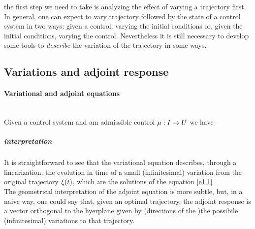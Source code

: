 the first step we need to take is analyzing the effect of varying a trajectory first. In general, one can expect to vary trajectory followed by the state of a control system in two ways: given a control, varying the initial conditions or, given the initial conditions, varying the control. Nevertheless it is still necessary to develop some tools to \textit{describe} the variation of the trajectory in some ways. 

\subsection{Variations and adjoint response}
\paragraph{Variational and adjoint equations}\mbox{}\\
Given a control system \controlSystem and am admissible control $\mu:I\rightarrow U$ we have

\subparagraph{interpretation} It is straightforward to see that the variational equation describes, through a linearization,  the evolution in time of a small (infinitesimal) variation from the original trajectory $\xi (t)$, which are the solutions of the equation \ref{e1.1}\\
The geometrical interpretation of the adjoint equation is more subtle, but, in a naive way, one could say that, given an optimal trajectory, the adjoint response is a vector orthogonal to the hyerplane given by (directions of the )the possibile (infinitesimal) variations to that trajectory. 

	